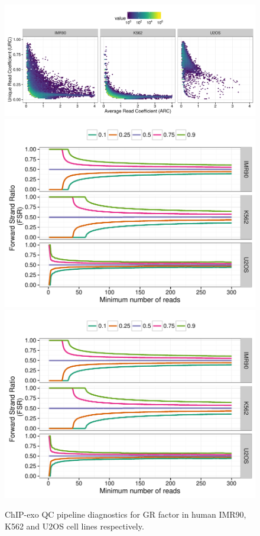 \documentclass{article}
\begin{document}
\begin{figure}[H]
  \centering
  \includegraphics[width = .75\textwidth,page =
1]{figures/supplement/QC/Meijsing_GR_enrichment.pdf}\\
\includegraphics[width = .65\textwidth,page =
1]{figures/supplement/QC/Meijsing_GR_strand_imbalance.pdf}
\includegraphics[width = .65\textwidth,page =
3]{figures/supplement/QC/Meijsing_GR_strand_imbalance.pdf}
\caption{ChIP-exo QC pipeline diagnostics for GR factor in human
  IMR90, K562 and U2OS cell lines respectively.}
  \label{sfig:qc6}
\end{figure}
\end{document}
